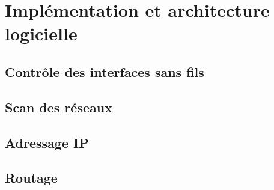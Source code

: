\chapter{Implémentation et architecture logicielle}
\section{Contrôle des interfaces sans fils}

\section{Scan des réseaux}
\section{Adressage IP}
\section{Routage}